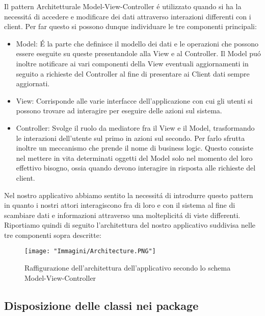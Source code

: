 \documentclass{article}
\begin{document}
Il pattern Architetturale Model-View-Controller \'e utilizzato quando si ha la necessit\'a di accedere e modificare dei dati attraverso interazioni differenti con i client. Per far questo si possono dunque individuare le tre componenti principali:

\begin{itemize}
\item Model: \'E la parte che definisce il modello dei dati e le operazioni che possono essere  eseguite su queste presentandole alla View e al Controller. Il Model pu\'o inoltre notificare ai vari componenti della View eventuali aggiornamenti in seguito a richieste del Controller al fine di presentare ai Client dati sempre aggiornati.

\item View: Corrisponde alle varie interfacce dell'applicazione con cui gli utenti si possono trovare ad interagire per eseguire delle azioni sul sistema.
 
\item Controller: Svolge il ruolo da mediatore fra il View e il Model, trasformando le interazioni dell'utente sul primo in azioni sul secondo. Per farlo sfrutta inoltre un meccanismo che prende il nome di business logic. Questo consiste nel mettere in vita determinati oggetti del Model solo nel momento del loro effettivo bisogno, ossia quando devono interagire in risposta alle richieste del client.
\end{itemize}

\newpage

Nel nostro applicativo abbiamo sentito la necessit\'a di introdurre questo pattern in quanto i nostri attori interagiscono fra di loro e con il sistema al fine di scambiare dati e informazioni attraverso una molteplicit\'a di viste differenti. \\
Riportiamo quindi di seguito l'architettura del nostro applicativo suddivisa nelle tre componenti sopra descritte:

\begin{figure}[!h]
\centering
\texttt{[image: "Immagini/Architecture.PNG"]}
\caption{Raffigurazione dell'architettura dell'applicativo secondo lo schema Model-View-Controller}
\end{figure}

\newpage

\subsection{Disposizione delle classi nei package} 
\end{document}
